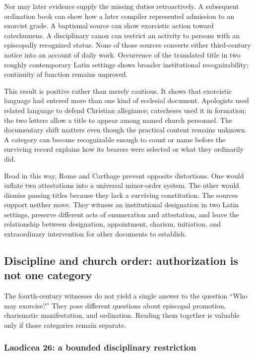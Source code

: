 Nor may later evidence supply the missing duties retroactively. A subsequent
ordination book can show how a later compiler represented admission to an
exorcist grade. A baptismal source can show exorcistic action toward
catechumens. A disciplinary canon can restrict an activity to persons with an
episcopally recognized status. None of those sources converts either
third-century notice into an account of daily work. Occurrence of the
translated title in two roughly contemporary Latin settings shows broader
institutional recognizability; continuity of function remains unproved.

This result is positive rather than merely cautious. It shows that
exorcistic language had entered more than one kind of ecclesial document.
Apologists used related language to defend Christian allegiance; catecheses
used it in formation; the two letters allow a title to appear among named
church personnel. The documentary shift matters even though the practical
content remains unknown. A category can become recognizable enough to count
or name before the surviving record explains how its bearers were selected
or what they ordinarily did.

Read in this way, Rome and Carthage prevent opposite distortions. One would
inflate two attestations into a universal minor-order system. The other would
dismiss passing titles because they lack a surviving constitution. The
sources support neither move. They witness an institutional designation in
two Latin settings, preserve different acts of enumeration and attestation,
and leave the relationship between designation, appointment, charism,
initiation, and extraordinary intervention for other documents to establish.

\subsection{Discipline and church order: authorization is not one category}

The fourth-century witnesses do not yield a single answer to the question
``Who may exorcise?'' They pose different questions about episcopal promotion,
charismatic manifestation, and ordination. Reading them together is valuable
only if those categories remain separate.

\subsubsection{Laodicea 26: a bounded disciplinary restriction}

